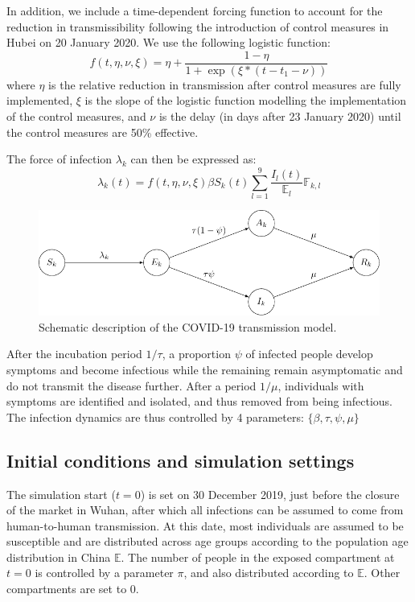 \documentclass{article}
\begin{document}
	In addition, we include a time-dependent forcing function to account for the reduction in transmissibility following the introduction of control measures in Hubei on 20 January 2020.
	We use the following logistic function:
	\begin{equation}
	f(t,\eta,\nu, \xi) = \eta + \frac{1-\eta}{1+\exp(\xi *(t-t_1-\nu))}
	\end{equation}
	where $\eta$ is the relative reduction in transmission after control measures are fully implemented, $\xi$ is the slope of the logistic function modelling the implementation of the control measures, and $\nu$ is the delay (in days after 23 January 2020) until the control measures are 50\% effective.
	
	The force of infection $\lambda_k$ can then be expressed as:
	\begin{equation}
	\lambda_k(t) = f(t,\eta,\nu, \xi) \beta S_k(t) \sum_{l=1}^9  \dfrac{I_l(t)}{\mathds{E}_l}  \mathds{F}_{k,l} 
	\end{equation}
	
	\begin{figure}[H]
		\centering
		\includegraphics[width=.7\linewidth]{../figures/fig_ode.pdf}
		\caption{Schematic description of the COVID-19 transmission model.}
		\label{fig:ode}
	\end{figure}
	
	After the incubation period $1/\tau$, a proportion $\psi$ of infected people develop symptoms and become infectious while the remaining remain asymptomatic and do not transmit the disease further. 
	After a period $1/\mu$, individuals with symptoms are identified and isolated, and thus removed from being infectious.
	The infection dynamics are thus controlled by 4 parameters: $\{\beta,\tau, \psi, \mu \}$
	
	\subsection{Initial conditions and simulation settings}
	
	The simulation start ($t=0$) is set on 30 December 2019, just before the closure of the market in Wuhan, after which all infections can be assumed to come from human-to-human transmission.
	At this date, most individuals are assumed to be susceptible and are distributed across age groups according to the  population age distribution in China $\mathds{E}$.
	The number of people in the exposed compartment at $t=0$ is controlled by a parameter $\pi$, and also distributed according to $\mathds{E}$.
	Other compartments are set to 0.
	
\end{document}
